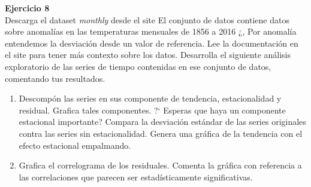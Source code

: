 \documentclass[a4paper, 11pt]{article}
\newenvironment{problem}[2][Ejercicio]
{ \begin{mdframed}[backgroundcolor= red!50] \textbf{#1 #2} \\}
	{  \end{mdframed}}
\begin{document}

\begin{problem}{8}
    Descarga el dataset \textit{monthly} desde el site 
    El conjunto de datos contiene datos sobre anomalías en las temperaturas mensuales de 1856 a 2016 ¿, Por anomalía entendemos la desviación desde un valor de referencia. Lee la documentación en el site para tener más contexto sobre los datos. Desarrolla el siguiente análisis exploratorio de las series de tiempo contenidas en ese conjunto de datos, comentando tus resultados.
    \begin{enumerate}
        \item Descompón las series en sus componente de tendencia, estacionalidad y residual. Grafica tales componentes. ?` Esperas que haya un componente estacional importante? Compara la desviación estándar de las series originales contra las series sin estacionalidad. Genera una gráfica de la tendencia con el efecto estacional empalmando.
        \item Grafica el correlograma de los residuales. Comenta la gráfica con referencia a las correlaciones que parecen ser estadísticamente significativas.
        
    \end{enumerate}
\end{problem}
\end{document}
